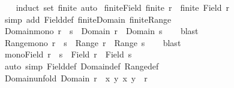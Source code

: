 \begin{isabellebody}
%
\isadelimproof
\ \ %
\endisadelimproof
%
\isatagproof
{}\isamarkupfalse%
\ {\isacharparenleft}{\kern0pt}induct\ set{\isacharcolon}{\kern0pt}\ finite{\isacharparenright}{\kern0pt}\ auto%
\endisatagproof
{\isafoldproof}%
%
\isadelimproof
\isanewline
%
\endisadelimproof
\isanewline
{}\isamarkupfalse%
\ finite{\isacharunderscore}{\kern0pt}Field{\isacharcolon}{\kern0pt}\ {\isachardoublequoteopen}finite\ r\ {\isasymLongrightarrow}\ finite\ {\isacharparenleft}{\kern0pt}Field\ r{\isacharparenright}{\kern0pt}{\isachardoublequoteclose}\isanewline
%
\isadelimproof
\ \ %
\endisadelimproof
%
\isatagproof
{}\isamarkupfalse%
\ {\isacharparenleft}{\kern0pt}simp\ add{\isacharcolon}{\kern0pt}\ Field{\isacharunderscore}{\kern0pt}def\ finite{\isacharunderscore}{\kern0pt}Domain\ finite{\isacharunderscore}{\kern0pt}Range{\isacharparenright}{\kern0pt}%
\endisatagproof
{\isafoldproof}%
%
\isadelimproof
\isanewline
%
\endisadelimproof
\isanewline
{}\isamarkupfalse%
\ Domain{\isacharunderscore}{\kern0pt}mono{\isacharcolon}{\kern0pt}\ {\isachardoublequoteopen}r\ {\isasymsubseteq}\ s\ {\isasymLongrightarrow}\ Domain\ r\ {\isasymsubseteq}\ Domain\ s{\isachardoublequoteclose}\isanewline
%
\isadelimproof
\ \ %
\endisadelimproof
%
\isatagproof
{}\isamarkupfalse%
\ blast%
\endisatagproof
{\isafoldproof}%
%
\isadelimproof
\isanewline
%
\endisadelimproof
\isanewline
{}\isamarkupfalse%
\ Range{\isacharunderscore}{\kern0pt}mono{\isacharcolon}{\kern0pt}\ {\isachardoublequoteopen}r\ {\isasymsubseteq}\ s\ {\isasymLongrightarrow}\ Range\ r\ {\isasymsubseteq}\ Range\ s{\isachardoublequoteclose}\isanewline
%
\isadelimproof
\ \ %
\endisadelimproof
%
\isatagproof
{}\isamarkupfalse%
\ blast%
\endisatagproof
{\isafoldproof}%
%
\isadelimproof
\isanewline
%
\endisadelimproof
\isanewline
{}\isamarkupfalse%
\ mono{\isacharunderscore}{\kern0pt}Field{\isacharcolon}{\kern0pt}\ {\isachardoublequoteopen}r\ {\isasymsubseteq}\ s\ {\isasymLongrightarrow}\ Field\ r\ {\isasymsubseteq}\ Field\ s{\isachardoublequoteclose}\isanewline
%
\isadelimproof
\ \ %
\endisadelimproof
%
\isatagproof
{}\isamarkupfalse%
\ {\isacharparenleft}{\kern0pt}auto\ simp{\isacharcolon}{\kern0pt}\ Field{\isacharunderscore}{\kern0pt}def\ Domain{\isacharunderscore}{\kern0pt}def\ Range{\isacharunderscore}{\kern0pt}def{\isacharparenright}{\kern0pt}%
\endisatagproof
{\isafoldproof}%
%
\isadelimproof
\isanewline
%
\endisadelimproof
\isanewline
{}\isamarkupfalse%
\ Domain{\isacharunderscore}{\kern0pt}unfold{\isacharcolon}{\kern0pt}\ {\isachardoublequoteopen}Domain\ r\ {\isacharequal}{\kern0pt}\ {\isacharbraceleft}{\kern0pt}x{\isachardot}{\kern0pt}\ {\isasymexists}y{\isachardot}{\kern0pt}\ {\isacharparenleft}{\kern0pt}x{\isacharcomma}{\kern0pt}\ y{\isacharparenright}{\kern0pt}\ {\isasymin}\ r{\isacharbraceright}{\kern0pt}{\isachardoublequoteclose}\isanewline

\end{isabellebody}
